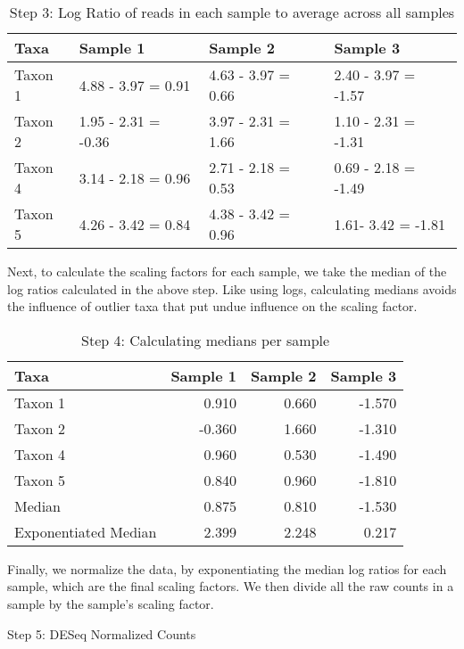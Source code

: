 \documentclass[
]{book}
\begin{document}
\begin{table}

\caption{\label{tab:unnamed-chunk-23}Step 3: Log Ratio of reads in each sample to average across all samples}
\centering
\begin{tabular}[t]{l|l|l|l}
\hline
Taxa & Sample 1 & Sample 2 & Sample 3\\
\hline
Taxon 1 & 4.88 - 3.97 = 0.91 & 4.63 - 3.97 = 0.66 & 2.40 - 3.97 = -1.57\\
\hline
Taxon 2 & 1.95 - 2.31 = -0.36 & 3.97 - 2.31 = 1.66 & 1.10 - 2.31 = -1.31\\
\hline
Taxon 4 & 3.14 - 2.18 = 0.96 & 2.71 - 2.18 = 0.53 & 0.69 - 2.18 = -1.49\\
\hline
Taxon 5 & 4.26 - 3.42 = 0.84 & 4.38 - 3.42 = 0.96 & 1.61- 3.42 = -1.81\\
\hline
\end{tabular}
\end{table}

Next, to calculate the scaling factors for each sample, we take the median of the log ratios calculated in the above step. Like using logs, calculating medians avoids the influence of outlier taxa that put undue influence on the scaling factor.

\begin{table}

\caption{\label{tab:unnamed-chunk-24}Step 4: Calculating medians per sample}
\centering
\begin{tabular}[t]{l|r|r|r}
\hline
Taxa & Sample 1 & Sample 2 & Sample 3\\
\hline
Taxon 1 & 0.910 & 0.660 & -1.570\\
\hline
Taxon 2 & -0.360 & 1.660 & -1.310\\
\hline
Taxon 4 & 0.960 & 0.530 & -1.490\\
\hline
Taxon 5 & 0.840 & 0.960 & -1.810\\
\hline
Median & 0.875 & 0.810 & -1.530\\
\hline
Exponentiated Median & 2.399 & 2.248 & 0.217\\
\hline
\end{tabular}
\end{table}

Finally, we normalize the data, by exponentiating the median log ratios for each sample, which are the final scaling factors. We then divide all the raw counts in a sample by the sample's scaling factor.

\label{tab:unnamed-chunk-25}Step 5: DESeq Normalized Counts
\end{document}
